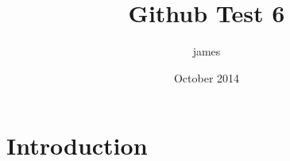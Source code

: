 \documentclass{article}
\title{Github Test 6}
\author{james }
\date{October 2014}
\begin{document}
\maketitle

\section{Introduction}
\end{document}
